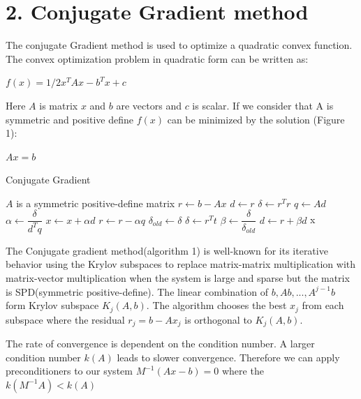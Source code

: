 \documentclass[times]{TRR}
\begin{document}
\section{2. Conjugate Gradient method}
The conjugate Gradient method is used to optimize a quadratic convex function. The convex optimization problem in quadratic form can be written as:
\begin{center}
$f(x) = 1/2x^{T}Ax - b^{T}x + c$
\end{center}
Here $A$ is matrix $x$ and $b$ are vectors and $c$ is scalar. If we consider that A is symmetric and positive define $f(x)$ can be minimized by the solution (Figure 1):
\begin{center}
$Ax=b$  
\end{center}

\begin{algorithm}
\caption{ Conjugate Gradient}\label{alg:cap}
\begin{algorithmic}
\Ensure $A$ is a symmetric positive-define matrix
\State $r \gets b - Ax$
\State $d \gets r$
\State $\delta \gets r^{T}r$
\State $q \gets Ad$
\State $\alpha \gets \dfrac{\delta}{d^{T}q}$
\State $x \gets x + \alpha d$
\State $r \gets r - \alpha q$
\State $\delta_{old} \gets \delta$
\State $\delta \gets r^{T}t$
\State $\beta \gets \dfrac{\delta}{\delta_{old}}$
\State $d \gets r + \beta d$
\EndWhile
\State \Return x
\end{algorithmic}
\end{algorithm}
\begin{par}
The Conjugate gradient method(algorithm 1) is well-known for its iterative behavior using the Krylov subspaces to replace matrix-matrix multiplication with matrix-vector multiplication when the system is large and sparse but the matrix is SPD(symmetric positive-define). The linear combination of $b, Ab,..., A^{j-1}b$ form Krylov subspace $K_j(A,b)$. The algorithm chooses the best $x_j$ from each subspace where the residual $r_j = b - Ax_j$ is orthogonal to $K_j(A,b)$.
\end{par}
\begin{par}
The rate of convergence is dependent on the condition number. A larger condition number $k(A)$ leads to slower convergence. Therefore we can apply preconditioners to our system $M^{-1}(Ax - b) = 0$ where the $k(M^{-1}A) < k(A)$
\end{par}
\end{document}
